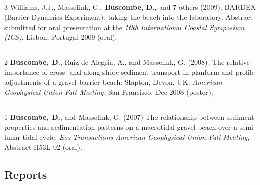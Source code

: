 \documentclass[margin,line]{resume}
\begin{document}
\begin{resume}
\begin{footnotesize}
	\subsection{}
	\begin{list1}
	\item[3] Williams, J.J., Masselink, G., {\bf Buscombe, D.}, and 7 others (2009). BARDEX (Barrier Dynamics Experiment): taking the beach into the laboratory. Abstract submitted for oral presentation at the {\sl 10th International Coastal Symposium (ICS)}, Lisbon, Portugal 2009 (oral).
	\end{list1}

	\subsection{}
	\begin{list1}
	
	\item[2] {\bf Buscombe, D.}, Ruiz de Alegria, A., and Masselink, G. (2008). The relative importance of cross- and along-shore sediment transport in planform and profile adjustments of a gravel barrier beach: Slapton, Devon, UK. {\sl American Geophysical Union Fall Meeting}, San Francisco, Dec 2008 (poster).
	\end{list1}
	
	\subsection{}

	\begin{list1}
	\item[1] {\bf Buscombe, D.}, and Masselink, G. (2007) The relationship between sediment properties and sedimentation patterns on a macrotidal gravel beach over a semi lunar tidal cycle. {\sl Eos Transactions American Geophysical Union Fall Meeting}, Abstract H53L-02 (oral).
	
	
	\end{list1}
	
	        \end{footnotesize}

	\subsection{\mysidestyle Reports}
        \begin{footnotesize}
	\begin{list1}
	 

\end{list1}
\end{footnotesize}
\end{resume}
\end{document}
